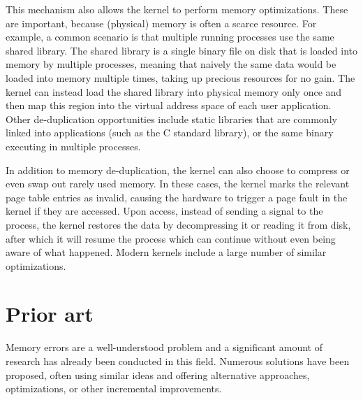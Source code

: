 This mechanism also allows the kernel to perform memory optimizations. These are important, because (physical) memory is often a scarce resource. For example, a common scenario is that multiple running processes use the same shared library. The shared library is a single binary file on disk that is loaded into memory by multiple processes, meaning that naively the same data would be loaded into memory multiple times, taking up precious resources for no gain. The kernel can instead load the shared library into physical memory only once and then map this region into the virtual address space of each user application. Other de-duplication opportunities include static libraries that are commonly linked into applications (such as the C standard library), or the same binary executing in multiple processes.

In addition to memory de-duplication, the kernel can also choose to compress or even swap out rarely used memory. In these cases, the kernel marks the relevant page table entries as invalid, causing the hardware to trigger a page fault in the kernel if they are accessed. Upon access, instead of sending a signal to the process, the kernel restores the data by decompressing it or reading it from disk, after which it will resume the process which can continue without even being aware of what happened. Modern kernels include a large number of similar optimizations. 


\section{Prior art}

Memory errors are a well-understood problem and a significant amount of research has already been conducted in this field. Numerous solutions have been proposed, often using similar ideas and offering alternative approaches, optimizations, or other incremental improvements.

